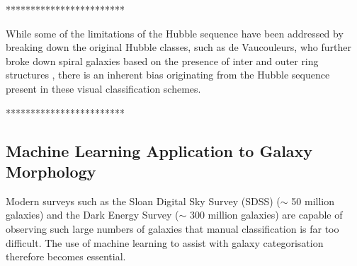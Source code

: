 \documentclass[12pt, onecolumn]{article}
\begin{document}
        ************************

        While some of the limitations of the Hubble sequence have been addressed by breaking down the original Hubble classes, such as de Vaucouleurs, who further broke down spiral galaxies based on the presence of inter and outer ring structures \cite{deVaucouleurs_system}, there is an inherent bias originating from the Hubble sequence present in these visual classification schemes.    

        ************************

        

    \subsection{Machine Learning Application to Galaxy Morphology}



        Modern surveys such as the Sloan Digital Sky Survey (SDSS) ($\sim$ 50 million galaxies) \cite{sdss} and the Dark Energy Survey ($\sim$ 300 million galaxies) \cite{des} are capable of observing such large numbers of galaxies that manual classification is far too difficult. The use of machine learning to assist with galaxy categorisation therefore becomes essential.
\end{document}
